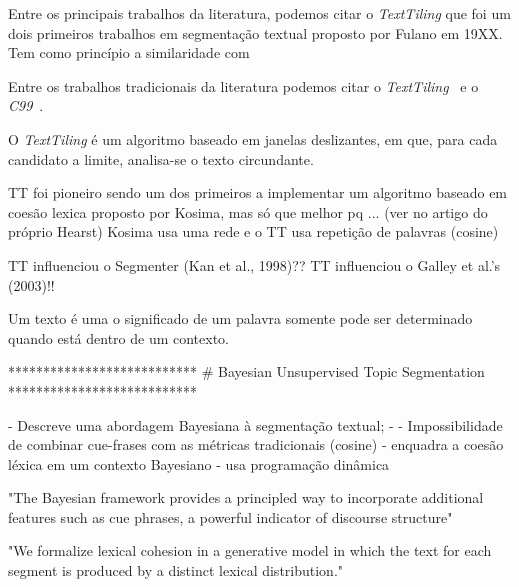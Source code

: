 




Entre os principais trabalhos da literatura, podemos citar o \textit{TextTiling} que foi um dois primeiros trabalhos em segmentação textual proposto por Fulano em 19XX. Tem como princípio a similaridade com







Entre os trabalhos tradicionais da literatura podemos citar o  \textit{TextTiling}~\cite{Hearst1994} e o \textit{C99}~\cite{Choi2000}. 

O \textit{TextTiling} é um algoritmo baseado em janelas deslizantes, em  que, para cada candidato a limite, analisa-se o texto circundante.



TT foi pioneiro sendo um dos primeiros a implementar um algoritmo baseado em coesão lexica proposto por Kosima, mas só que melhor pq ... (ver no artigo do próprio Hearst)
Kosima usa uma rede e o TT usa repetição de palavras (cosine)



TT influenciou o Segmenter (Kan et al., 1998)??
TT influenciou o Galley et al.’s (2003)!!



Um texto é uma 
o significado de um palavra somente pode ser determinado quando está dentro de um contexto.













***************************
# Bayesian Unsupervised Topic Segmentation
***************************

- Descreve uma abordagem Bayesiana à segmentação textual;
- 
- Impossibilidade de combinar cue-frases com as métricas tradicionais (cosine)
- {enquadra a coesão léxica em um contexto Bayesiano}
- usa programação dinâmica

"The Bayesian framework provides a principled way to incorporate additional features such as cue phrases, a powerful indicator of discourse structure"


"We formalize lexical cohesion in a generative model in which the text for each segment is produced by a distinct lexical distribution." 


